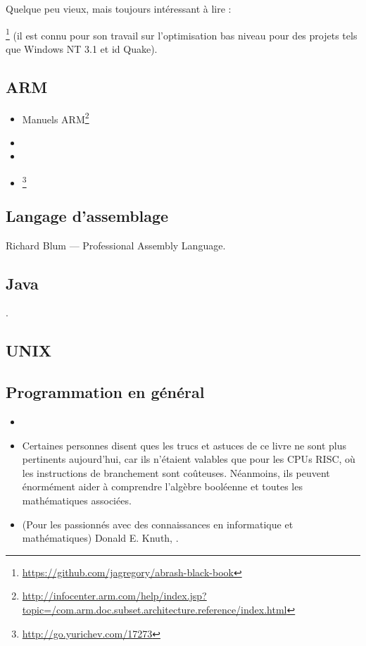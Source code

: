 Quelque peu vieux, mais toujours intéressant à lire :

\MAbrash\footnote{\AlsoAvailableAs \url{https://github.com/jagregory/abrash-black-book}}
(il est connu pour son travail sur l'optimisation bas niveau pour des projets tels que Windows NT 3.1 et id Quake).

\subsection{ARM}

\begin{itemize}
\item Manuels ARM\footnote{\AlsoAvailableAs \url{http://infocenter.arm.com/help/index.jsp?topic=/com.arm.doc.subset.architecture.reference/index.html}}

\item \ARMSevenRef

\item \ARMSixFourRefURL

\item \ARMCookBook\footnote{\AlsoAvailableAs \url{http://go.yurichev.com/17273}}
\end{itemize}

\subsection{Langage d'assemblage}

Richard Blum --- Professional Assembly Language.

\subsection{Java}

\JavaBook.

\subsection{UNIX}

\TAOUP

\subsection{Programmation en général}

\begin{itemize}

\item \RobPikePractice

\item \HenryWarren
Certaines personnes disent ques les trucs et astuces de ce livre ne sont plus pertinents
aujourd'hui, car ils n'étaient valables que pour les \ac{CPU}s \ac{RISC}, où les instructions
de branchement sont coûteuses.
Néanmoins, ils peuvent énormément aider à comprendre l'algèbre booléenne et toutes les
mathématiques associées.

\item{(Pour les passionnés avec des connaissances en informatique et mathématiques) Donald E. Knuth, }.

\end{itemize}





